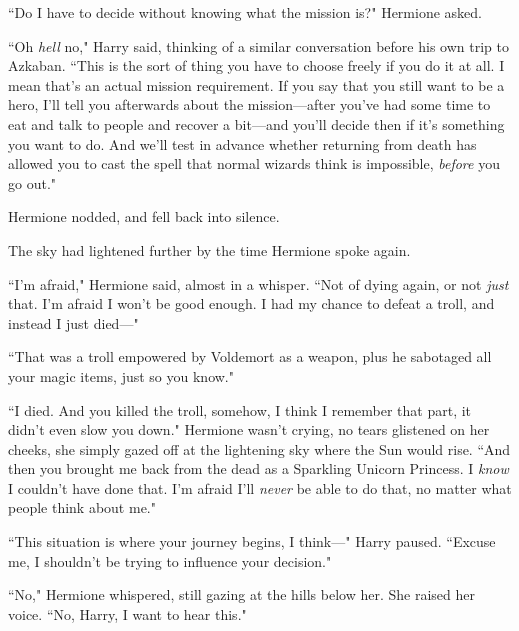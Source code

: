 ``Do I have to decide without knowing what the mission is?" Hermione asked.

``Oh \emph{hell} no," Harry said, thinking of a similar conversation before his own trip to Azkaban. ``This is the sort of thing you have to choose freely if you do it at all. I mean that's an actual mission requirement. If you say that you still want to be a hero, I'll tell you afterwards about the mission—after you've had some time to eat and talk to people and recover a bit—and you'll decide then if it's something you want to do. And we'll test in advance whether returning from death has allowed you to cast the spell that normal wizards think is impossible, \emph{before} you go out."

Hermione nodded, and fell back into silence.

The sky had lightened further by the time Hermione spoke again.

``I'm afraid," Hermione said, almost in a whisper. ``Not of dying again, or not \emph{just} that. I'm afraid I won't be good enough. I had my chance to defeat a troll, and instead I just died—"

``That was a troll empowered by Voldemort as a weapon, plus he sabotaged all your magic items, just so you know."

``I died. And you killed the troll, somehow, I think I remember that part, it didn't even slow you down." Hermione wasn't crying, no tears glistened on her cheeks, she simply gazed off at the lightening sky where the Sun would rise. ``And then you brought me back from the dead as a Sparkling Unicorn Princess. I \emph{know} I couldn't have done that. I'm afraid I'll \emph{never} be able to do that, no matter what people think about me."

``This situation is where your journey begins, I think—" Harry paused. ``Excuse me, I shouldn't be trying to influence your decision."

``No," Hermione whispered, still gazing at the hills below her. She raised her voice. ``No, Harry, I want to hear this."

